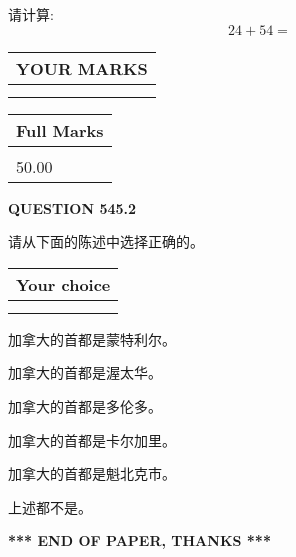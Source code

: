 \documentclass{ctexart}
\begin{document}
  
 
请计算:
\begin{equation}
24 +  %
54 = \nonumber
\end{equation}
 

 

 
  
\vspace{0.2in}
  
\noindent\begin{tabular}{|l|}
\hline
 YOUR MARKS  \\
\hline
 \\ 
 \\ 
\hline
\end{tabular}
\hspace{0.05in} \begin{tabular}{|l|}
\hline
 Full Marks  \\
\hline
 \\ 
50.00 \\
\hline
\end{tabular}
{\textbf{\Large{QUESTION
545.2 
}}}
  
  
请从下面的陈述中选择正确的。
  
  
\noindent\hspace{3.0in} \begin{tabular}{|l|}
\hline
Your choice \\
\hline
 \\ 
 \\ 
\hline
\end{tabular}
  
  
 
 
加拿大的首都是蒙特利尔。
 
 
加拿大的首都是渥太华。
 
 
加拿大的首都是多伦多。
 
 
加拿大的首都是卡尔加里。
 
 
加拿大的首都是魁北克市。
 
 
 上述都不是。
 
 
   
   
 \vspace{0.2in}
 
   
   
   
   
\vspace{1.0in} 
{\textbf{\large{ *** END OF PAPER, THANKS *** }}} 
   
\end{document}
